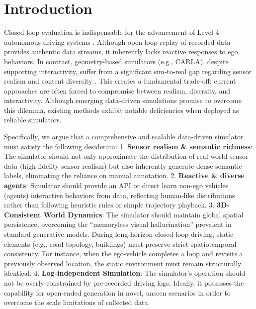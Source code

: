 \section{Introduction}
\label{sec:intro}

Closed-loop evaluation is indispensable for the advancement of Level 4 autonomous driving systems \cite{caesar2021nuplan, dauner2024navsim, codevilla2018offline}. Although open-loop replay of recorded data provides authentic data streams, it inherently lacks reactive responses to ego behaviors. In contrast, geometry-based simulators (e.g., CARLA\cite{Dosovitskiy17}), despite supporting interactivity, suffer from a significant sim-to-real gap regarding sensor realism and content diversity \cite{yang2023unisim, zhang2025epona}. This creates a fundamental trade-off: current approaches are often forced to compromise between realism, diversity, and interactivity. Although emerging data-driven simulations \cite{yan2025drivingsphere, zhou2024hugsim} promise to overcome this dilemma, existing methods exhibit notable deficiencies when deployed as reliable simulators. 

Specifically, we argue that a comprehensive and scalable data-driven simulator must satisfy the following desiderata: 1. \textbf{Sensor realism \& semantic richness}: The simulator should not only approximate the distribution of real-world sensor data (high-fidelity sensor realism) but also inherently generate dense semantic labels, eliminating the reliance on manual annotation. 2. \textbf{Reactive \& diverse agents}: Simulator should provide an API or direct learn non-ego vehicles (agents) interactive behaviors from data, reflecting human-like distributions rather than following heuristic rules or simple trajectory playback. 3. \textbf{3D-Consistent World Dynamics}: The simulator should maintain global spatial persistence, overcoming the ``memoryless visual hallucination'' prevalent in standard generative models. During long-horizon closed-loop driving, static elements (e.g., road topology, buildings) must preserve strict spatiotemporal consistency. For instance, when the ego-vehicle completes a loop and revisits a previously observed location, the static environment must remain structurally identical. 4. \textbf{Log-independent Simulation}: The simulator's operation should not be overly-constrained by pre-recorded driving logs. Ideally, it possesses the capability for open-ended generation in novel, unseen scenarios in order to overcome the scale limitations of collected data.

